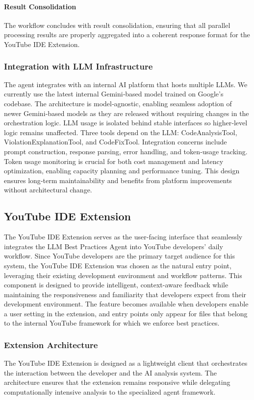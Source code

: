 \begin{spacing}{1.2}
\paragraph{Result Consolidation}
The workflow concludes with result consolidation, ensuring that all parallel processing results are properly aggregated into a coherent response format for the YouTube IDE Extension.

\subsubsection{Integration with LLM Infrastructure}
The agent integrates with an internal AI platform that hosts multiple LLMs. We currently use the latest internal Gemini‑based model trained on Google's codebase. The architecture is model‑agnostic, enabling seamless adoption of newer Gemini‑based models as they are released without requiring changes in the orchestration logic. LLM usage is isolated behind stable interfaces so higher‑level logic remains unaffected. Three tools depend on the LLM: CodeAnalysisTool, ViolationExplanationTool, and CodeFixTool. Integration concerns include prompt construction, response parsing, error handling, and token‑usage tracking. Token usage monitoring is crucial for both cost management and latency optimization, enabling capacity planning and performance tuning. This design ensures long‑term maintainability and benefits from platform improvements without architectural change.

\subsection{YouTube IDE Extension}
The YouTube IDE Extension serves as the user-facing interface that seamlessly integrates the LLM Best Practices Agent into YouTube developers' daily workflow. Since YouTube developers are the primary target audience for this system, the YouTube IDE Extension was chosen as the natural entry point, leveraging their existing development environment and workflow patterns. This component is designed to provide intelligent, context-aware feedback while maintaining the responsiveness and familiarity that developers expect from their development environment. The feature becomes available when developers enable a user setting in the extension, and entry points only appear for files that belong to the internal YouTube framework for which we enforce best practices.

\subsubsection{Extension Architecture}
The YouTube IDE Extension is designed as a lightweight client that orchestrates the interaction between the developer and the AI analysis system. The architecture ensures that the extension remains responsive while delegating computationally intensive analysis to the specialized agent framework.


\end{spacing}
